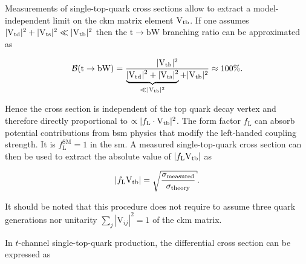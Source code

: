 
Measurements of single-top-quark cross sections allow to extract a model-independent limit on the \gls{ckm} matrix element ${\mathrm{V}_\mathrm{tb}}$. If one assumes $|{\mathrm{V}_\mathrm{td}}|^2+|{\mathrm{V}_\mathrm{ts}}|^2\ll|{\mathrm{V}_\mathrm{tb}}|^2$ then the $\mathrm{t}\to\mathrm{bW}$ branching ratio can be approximated as

\begin{equation}
\mathcal{B}(\mathrm{t}\to\mathrm{bW})=\frac{|{\mathrm{V}_\mathrm{tb}}|^2}{\underbrace{|{\mathrm{V}_\mathrm{td}}|^2+|{\mathrm{V}_\mathrm{ts}}|^2}_{\ll|{\mathrm{V}_\mathrm{tb}}|^2}+|{\mathrm{V}_\mathrm{tb}}|^2}\approx 100\%.
\end{equation}

Hence the cross section is independent of the top quark decay vertex and therefore directly proportional to $\propto|f_\mathrm{L}\cdot{\mathrm{V}_\mathrm{tb}}|^2$. The form factor $f_\mathrm{L}$ can absorb potential contributions from \gls{bsm} physics that modify the left-handed coupling strength. It is $f_\mathrm{L}^\mathrm{SM}=1$ in the \gls{sm}. A measured single-top-quark cross section can then be used to extract the absolute value of $|f_\mathrm{L}{\mathrm{V}_\mathrm{tb}}|$ as

\begin{equation}
|f_\mathrm{L}\vtb|=\sqrt{\frac{\sigma_\mathrm{measured}}{\sigma_\mathrm{theory}}}.
\end{equation}

It should be noted that this procedure does not require to assume three quark generations nor unitarity $\sum_j|\mathrm{V}_{ij}|^2=1$ of the \gls{ckm} matrix.

In $t$-channel single-top-quark production, the differential cross section can be expressed as

